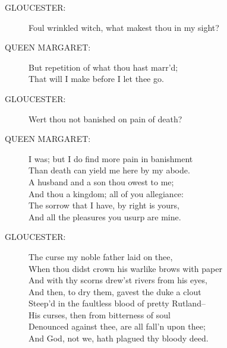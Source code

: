 \documentclass{article}
\begin{document}
\begin{description}
\item[GLOUCESTER:] 
\hspace{1pt}Foul wrinkled witch, what makest thou in my sight?\\
\end{description}
\begin{description}
\item[QUEEN MARGARET:] 
\hspace{1pt}But repetition of what thou hast marr'd;\\
\hspace{1pt}That will I make before I let thee go.\\
\end{description}
\begin{description}
\item[GLOUCESTER:] 
\hspace{1pt}Wert thou not banished on pain of death?\\
\end{description}
\begin{description}
\item[QUEEN MARGARET:] 
\hspace{1pt}I was; but I do find more pain in banishment\\
\hspace{1pt}Than death can yield me here by my abode.\\
\hspace{1pt}A husband and a son thou owest to me;\\
\hspace{1pt}And thou a kingdom; all of you allegiance:\\
\hspace{1pt}The sorrow that I have, by right is yours,\\
\hspace{1pt}And all the pleasures you usurp are mine.\\
\end{description}
\begin{description}
\item[GLOUCESTER:] 
\hspace{1pt}The curse my noble father laid on thee,\\
\hspace{1pt}When thou didst crown his warlike brows with paper\\
\hspace{1pt}And with thy scorns drew'st rivers from his eyes,\\
\hspace{1pt}And then, to dry them, gavest the duke a clout\\
\hspace{1pt}Steep'd in the faultless blood of pretty Rutland--\\
\hspace{1pt}His curses, then from bitterness of soul\\
\hspace{1pt}Denounced against thee, are all fall'n upon thee;\\
\hspace{1pt}And God, not we, hath plagued thy bloody deed.\\
\end{description}
\end{document}

